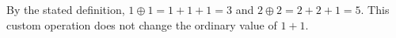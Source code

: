 By the stated definition, $1\oplus1=1+1+1=3$ and $\boxed{2\oplus2=2+2+1=5}$. This custom operation does not change the ordinary value of $1+1$.

